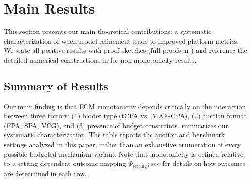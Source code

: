 
\section{Main Results}
\label{sec:results}

This section presents our main theoretical contributions: a systematic characterization of when model refinement leads to improved platform metrics. We state all positive results with proof sketches (full proofs in ) and reference the detailed numerical constructions in  for non-monotonicity results.

\subsection{Summary of Results}
\label{subsec:results-summary}

Our main finding is that ECM monotonicity depends critically on the interaction between three factors: (1) bidder type (tCPA vs.\ MAX-CPA), (2) auction format (FPA, SPA, VCG), and (3) presence of budget constraints.  summarizes our systematic characterization. The table reports the auction and benchmark settings analyzed in this paper, rather than an exhaustive enumeration of every possible budgeted mechanism variant. Note that monotonicity is defined relative to a setting-dependent outcome mapping $\Phi_{\text{setting}}$; see  for details on how outcomes are determined in each row.

